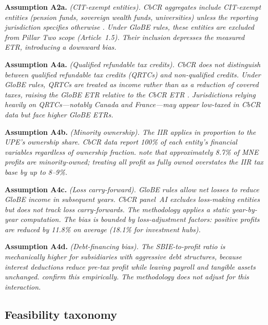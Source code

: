 \documentclass[11pt,a4paper]{article}
\newcommand{\assumption}[2]{\noindent\textbf{Assumption #1.} \textit{#2}\medskip}
\begin{document}
\assumption{A2a}{(CIT-exempt entities). CbCR aggregates include CIT-exempt entities (pension funds, sovereign wealth funds, universities) unless the reporting jurisdiction specifies otherwise \citep{oecd2025a}. Under GloBE rules, these entities are excluded from Pillar Two scope (Article~1.5). Their inclusion depresses the measured ETR, introducing a downward bias.}

\assumption{A4a}{(Qualified refundable tax credits). CbCR does not distinguish between qualified refundable tax credits (QRTCs) and non-qualified credits. Under GloBE rules, QRTCs are treated as income rather than as a reduction of covered taxes, raising the GloBE ETR relative to the CbCR ETR \citep{ferreiraliotti2022}. Jurisdictions relying heavily on QRTCs---notably Canada and France---may appear low-taxed in CbCR data but face higher GloBE ETRs.}

\assumption{A4b}{(Minority ownership). The IIR applies in proportion to the UPE's ownership share. CbCR data report 100\% of each entity's financial variables regardless of ownership fraction. \citet{barake2022} note that approximately 8.7\% of MNE profits are minority-owned; treating all profit as fully owned overstates the IIR tax base by up to 8--9\%.}

\assumption{A4c}{(Loss carry-forward). GloBE rules allow net losses to reduce GloBE income in subsequent years. CbCR panel~AI excludes loss-making entities but does not track loss carry-forwards. The methodology applies a static year-by-year computation. The bias is bounded by loss-adjustment factors: positive profits are reduced by 11.8\% on average (18.1\% for investment hubs).}

\assumption{A4d}{(Debt-financing bias). The SBIE-to-profit ratio is mechanically higher for subsidiaries with aggressive debt structures, because interest deductions reduce pre-tax profit while leaving payroll and tangible assets unchanged. \citet{devereux2023} confirm this empirically. The methodology does not adjust for this interaction.}

\subsection{Feasibility taxonomy}
\end{document}
